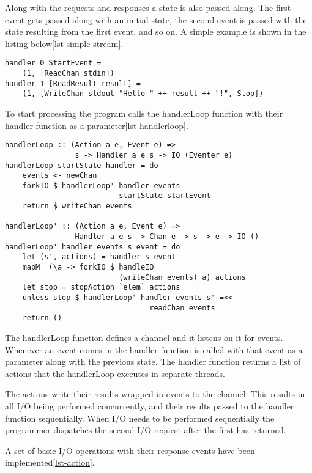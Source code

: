 Along with the requests and responses a state is also passed along. The first event gets passed along with an initial state, the second event is passed with the state resulting from the first event, and so on. A simple example is shown in the listing below\ref{lst-simple-stream}.

\begin{lstlisting}[caption={Stream-based example},label={lst-simple-stream}]
handler 0 StartEvent =
    (1, [ReadChan stdin])
handler 1 [ReadResult result] =
    (1, [WriteChan stdout "Hello " ++ result ++ "!", Stop])
\end{lstlisting}

To start processing the program calls the handlerLoop function with their handler function as a parameter\ref{lst-handlerloop}.

\begin{lstlisting}[caption={The handlerLoop}, label={lst-handlerloop}]
handlerLoop :: (Action a e, Event e) =>
                s -> Handler a e s -> IO (Eventer e)
handlerLoop startState handler = do
    events <- newChan
    forkIO $ handlerLoop' handler events
                          startState startEvent
    return $ writeChan events

handlerLoop' :: (Action a e, Event e) =>
                Handler a e s -> Chan e -> s -> e -> IO ()
handlerLoop' handler events s event = do
    let (s', actions) = handler s event
    mapM_ (\a -> forkIO $ handleIO 
                          (writeChan events) a) actions
    let stop = stopAction `elem` actions
    unless stop $ handlerLoop' handler events s' =<<
                                 readChan events
    return ()
\end{lstlisting}

The handlerLoop function defines a channel and it listens on it for events. Whenever an event comes in the handler function is called with that event as a parameter along with the previous state. The handler function returns a list of actions that the handlerLoop executes in separate threads. 

The actions write their results wrapped in events to the channel. This results in all I/O being performed concurrently, and their results passed to the handler function sequentially.
When I/O needs to be performed sequentially the programmer dispatches the second I/O request after the first has returned.

A set of basic I/O operations with their response events have been implemented\ref{lst-action}.

